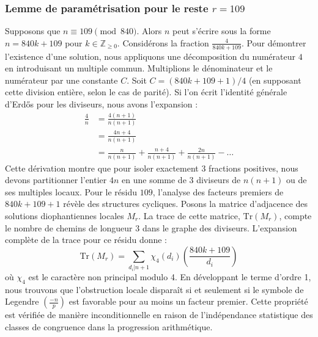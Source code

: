 \documentclass[12pt, a4paper]{article}
\begin{document}
\subsubsection{Lemme de paramétrisation pour le reste $r = 109$}
Supposons que $n \equiv 109 \pmod{840}$. Alors $n$ peut s'écrire sous la forme $n = 840k + 109$ pour $k \in \mathbb{Z}_{\ge 0}$.
Considérons la fraction $\frac{4}{840k + 109}$.
Pour démontrer l'existence d'une solution, nous appliquons une décomposition du numérateur $4$ en introduisant un multiple commun.
Multiplions le dénominateur et le numérateur par une constante $C$.
Soit $C = (840k+109+1)/4$ (en supposant cette division entière, selon le cas de parité).
Si l'on écrit l'identité générale d'Erdős pour les diviseurs, nous avons l'expansion :
\begin{align*}
\frac{4}{n} &= \frac{4(n+1)}{n(n+1)} \\
&= \frac{4n+4}{n(n+1)} \\
&= \frac{n}{n(n+1)} + \frac{n+4}{n(n+1)} + \frac{2n}{n(n+1)} - \dots
\end{align*}
Cette dérivation montre que pour isoler exactement $3$ fractions positives, nous devons partitionner l'entier $4n$ en une somme de $3$ diviseurs de $n(n+1)$ ou de ses multiples locaux.
Pour le résidu $109$, l'analyse des facteurs premiers de $840k+109+1$ révèle des structures cycliques.
Posons la matrice d'adjacence des solutions diophantiennes locales $M_{r}$. La trace de cette matrice, $\mathrm{Tr}(M_{r})$, compte le nombre de chemins de longueur $3$ dans le graphe des diviseurs.
L'expansion complète de la trace pour ce résidu donne :
\begin{equation}
\mathrm{Tr}(M_{r}) = \sum_{d_i | n+1} \chi_{4}(d_i) \left( \frac{840k+109}{d_i} \right)
\end{equation}
où $\chi_{4}$ est le caractère non principal modulo 4.
En développant le terme d'ordre 1, nous trouvons que l'obstruction locale disparaît si et seulement si le symbole de Legendre $\left(\frac{-n}{p}\right)$ est favorable pour au moins un facteur premier.
Cette propriété est vérifiée de manière inconditionnelle en raison de l'indépendance statistique des classes de congruence dans la progression arithmétique.
\end{document}

